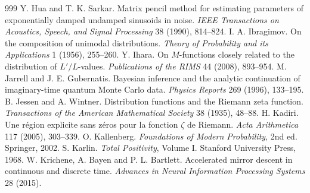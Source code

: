 \begin{thebibliography}{999}
 Y. Hua and T. K. Sarkar. Matrix pencil method for estimating parameters of exponentially damped undamped sinusoids in noise. \emph{IEEE Transactions on Acoustics, Speech, and Signal Processing} 38 (1990), 814--824.
 I. A. Ibragimov. On the composition of unimodal distributions. \emph{Theory of Probability and its Applications} 1 (1956), 255--260.
 Y. Ihara. On $M$-functions closely related to the distribution of $L'/L$-values. \emph{Publications of the RIMS} 44 (2008), 893--954.
 M. Jarrell and J. E. Gubernatis. Bayesian inference and the analytic continuation of imaginary-time quantum Monte Carlo data. \emph{Physics Reports} 269 (1996), 133--195.
 B. Jessen and A. Wintner. Distribution functions and the Riemann zeta function. \emph{Transactions of the American Mathematical Society} 38 (1935), 48--88.
 H. Kadiri. Une r\'egion explicite sans z\'eros pour la fonction $\zeta$ de Riemann. \emph{Acta Arithmetica} 117 (2005), 303--339.
 O. Kallenberg. \emph{Foundations of Modern Probability}, 2nd ed. Springer, 2002.
 S. Karlin. \emph{Total Positivity}, Volume I. Stanford University Press, 1968.
 W. Krichene, A. Bayen and P. L. Bartlett. Accelerated mirror descent in continuous and discrete time. \emph{Advances in Neural Information Processing Systems} 28 (2015).

\end{thebibliography}
